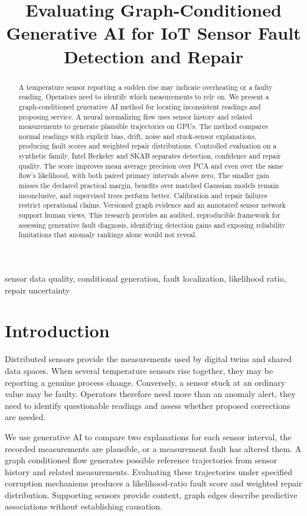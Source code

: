 \documentclass[conference]{IEEEtran}
\title{Evaluating Graph-Conditioned Generative AI for IoT Sensor Fault Detection and Repair}
\author{
\IEEEauthorblockN{Alexander V. Mantzaris}
\IEEEauthorblockA{
School of Data, Mathematical\\
and Statistical Sciences\\
University of Central Florida\\
Orlando, FL, USA\\
alexander.mantzaris@ucf.edu
}
\and
\IEEEauthorblockN{James H. Korris}
\IEEEauthorblockA{
Creative Technologies Inc.\\
Hollywood, CA, USA\\
james.korris@cretecinc.com
}
}
\newcommand{\1}{\mathbf{1}}
\begin{document}
\maketitle
\begin{abstract}
A temperature sensor reporting a sudden rise may indicate overheating or a faulty reading. Operators need to identify which measurements to rely on. We present a graph-conditioned generative AI method for locating inconsistent readings and proposing service. A neural normalizing flow uses sensor history and related measurements to generate plausible trajectories on GPUs. The method compares normal readings with explicit bias, drift, noise and stuck-sensor explanations, producing fault scores and weighted repair distributions. Controlled evaluation on a synthetic family, Intel Berkeley and SKAB separates detection, confidence and repair quality. The score improves mean average precision over PCA and even over the same flow's likelihood, with both paired primary intervals above zero. The smaller gain misses the declared practical margin, benefits over matched Gaussian models remain inconclusive, and supervised trees perform better. Calibration and repair failures restrict operational claims. Versioned graph evidence and an annotated sensor network support human views. This research provides an audited, reproducible framework for assessing generative fault diagnosis, identifying detection gains and exposing reliability limitations that anomaly rankings alone would not reveal.
\end{abstract}
\begin{IEEEkeywords}
sensor data quality, conditional generation, fault localization, likelihood ratio, repair uncertainty
\end{IEEEkeywords}



\section{Introduction}
Distributed sensors provide the measurements used by digital twins and shared data spaces. When several temperature sensors rise together, they may be reporting a genuine process change. Conversely, a sensor stuck at an ordinary value may be faulty. Operators therefore need more than an anomaly alert, they need to identify questionable readings and assess whether proposed corrections are needed.

We use generative AI to compare two explanations for each sensor interval, the recorded measurements are plausible, or a measurement fault has altered them. A graph conditioned flow generates possible reference trajectories from sensor history and related measurements. Evaluating these trajectories under specified corruption mechanisms produces a likelihood-ratio fault score and weighted repair distribution. Supporting sensors provide context, graph edges describe predictive associations without establishing causation.
\end{document}

